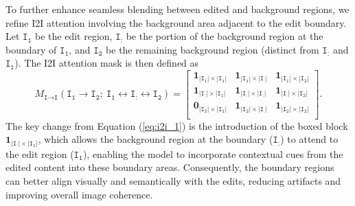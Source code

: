 \documentclass{article}
\begin{document}
To further enhance seamless blending between edited and background regions, we refine I2I attention involving the background area adjacent to the edit boundary. Let $\texttt{I}_\texttt{1}$ be the edit region, $\texttt{I}_\texttt{:}$ be the portion of the background region at the boundary of $\texttt{I}_\texttt{1}$, and $\texttt{I}_\texttt{2}$ be the remaining background region (distinct from $\texttt{I}_\texttt{:}$ and $\texttt{I}_\texttt{1}$). The I2I attention mask is then defined as
\begin{equation}
M_{\texttt{I}\to\texttt{I}}(\texttt{I}_\texttt{1}\to\texttt{I}_\texttt{2};\  \texttt{I}_\texttt{1}\leftrightarrow\texttt{I}_\texttt{:}\!\leftrightarrow \texttt{I}_\texttt{2}) =   \begin{bmatrix}
        \mathbf{1}_{|\texttt{I}_\texttt{1}|\times|\texttt{I}_\texttt{1}|} &  \mathbf{1}_{|\texttt{I}_\texttt{1}|\times|\texttt{I}_\texttt{:}|}&\mathbf{1}_{|\texttt{I}_\texttt{1}|\times|\texttt{I}_\texttt{2}|}\\

\boxed{\mathbf{1}_{|\texttt{I}_\texttt{:}|\times|\texttt{I}_\texttt{1}|}} &  \mathbf{1}_{|\texttt{I}_\texttt{:}|\times|\texttt{I}_\texttt{:}|}&\mathbf{1}_{|\texttt{I}_\texttt{:}|\times|\texttt{I}_\texttt{2}|}\\
\mathbf{0}_{|\texttt{I}_\texttt{2}|\times|\texttt{I}_\texttt{1}|} &  \mathbf{1}_{|\texttt{I}_\texttt{2}|\times|\texttt{I}_\texttt{:}|}&\mathbf{1}_{|\texttt{I}_\texttt{2}|\times|\texttt{I}_\texttt{2}|}\\
    \end{bmatrix}.
\label{eq:i2i_2}
\end{equation}
The key change from Equation (\ref{eq:i2i_1}) is the introduction of the boxed block $\mathbf{1}_{|\texttt{I}_\texttt{:}|\times|\texttt{I}_\texttt{1}|}$, which allows the background region at the boundary ($\texttt{I}_\texttt{:}$) to attend to the edit region ($\texttt{I}_\texttt{1}$), enabling the model to incorporate contextual cues from the edited content into these boundary areas. Consequently, the boundary regions can better align visually and semantically with the edits, reducing artifacts and improving overall image coherence.
\end{document}
